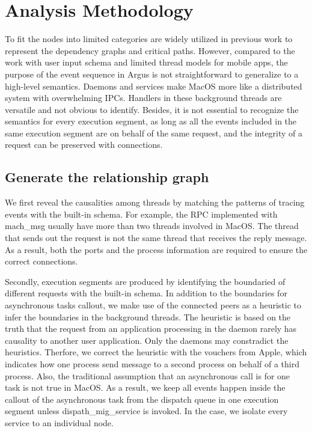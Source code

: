 \section{Analysis Methodology}
To fit the nodes into limited categories are widely utilized in previous work to represent the dependency graphs and critical paths\cite{Magpie, AppInsight, Panaappticon}.
However, compared to the work with user input schema and limited thread models for mobile apps, the purpose of the event sequence in Argus is not straightforward to generalize to a high-level semantics.
Daemons and services make MacOS more like a distributed system with overwhelming IPCs.
Handlers in these background threads are versatile and not obvious to identify.
Besides, it is not essential to recognize the semantics for every execution segment, as long as all the events included in the same execution segment are on behalf of the same request, and the integrity of a request can be preserved with connections.

\subsection{Generate the relationship graph}
We first reveal the causalities among threads by matching the patterns of tracing events with the built-in schema.
For example, the RPC implemented with mach\_msg usually have more than two threads involved in MacOS. 
The thread that sends out the request is not the same thread that receives the reply message.
As a result, both the ports and the process information are required to ensure the correct connections.

Secondly, execution segments are produced by identifying the boundaried of different requests with the built-in schema.
In addition to the boundaries for asynchronous tasks callout, we make use of the connected peers as a heuristic to infer the boundaries in the background threads.
The heuristic is based on the truth that the request from an application processing in the daemon rarely has causality to another user application.
Only the daemons may constradict the heuristics.
Therfore, we correct the heuristic with the vouchers from Apple, which indicates how one process send message to a second process on behalf of a third process. 
Also, the traditional assumption that an asynchronous call is for one task is not true in MacOS.
As a result, we keep all events happen inside the callout of the asynchronous task from the dispatch queue in one execution segment unless dispath\_mig\_service is invoked.
In the case, we isolate every service to an individual node.

